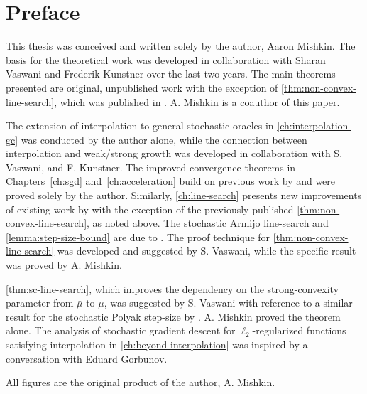 
\chapter{Preface}

This thesis was conceived and written solely by the author, Aaron Mishkin. 
The basis for the theoretical work was developed in collaboration with Sharan Vaswani and Frederik Kunstner over the last two years.
The main theorems presented are original, unpublished work with the exception of \autoref{thm:non-convex-line-search}, which was published in \citet{vaswani2019painless}. A. Mishkin is a coauthor of this paper.

The extension of interpolation to general stochastic oracles in \autoref{ch:interpolation-gc} was conducted by the author alone, while the connection between interpolation and weak/strong growth was developed in collaboration with S. Vaswani, and F. Kunstner. 
The improved convergence theorems in Chapters~\ref{ch:sgd} and~\ref{ch:acceleration} build on previous work by \citet{vaswani2019fast} and were proved solely by the author.  
Similarly, \autoref{ch:line-search} presents new improvements of existing work by \citet{vaswani2019painless} with the exception of the previously published \autoref{thm:non-convex-line-search}, as noted above.
The stochastic Armijo line-search and \autoref{lemma:step-size-bound} are due to \citep{vaswani2019painless}. 
The proof technique for \autoref{thm:non-convex-line-search} was developed and suggested by S. Vaswani, while the specific result was proved by A. Mishkin. 

\autoref{thm:sc-line-search}, which improves the dependency on the strong-convexity parameter from \( \bar \mu \) to \( \mu \), was suggested by S. Vaswani with reference to a similar result for the stochastic Polyak step-size by \citet{loizou2020sps}. 
A. Mishkin proved the theorem alone. 
The analysis of stochastic gradient descent for \( \ell_2 \)-regularized functions satisfying interpolation in \autoref{ch:beyond-interpolation} was inspired by a conversation with Eduard Gorbunov.

All figures are the original product of the author, A. Mishkin.
